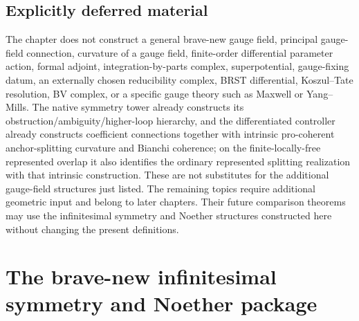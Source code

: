 \subsection{Explicitly deferred material}
\label{subsec:symmetry-noether-explicitly-deferred-material}

The chapter does not construct a general brave-new gauge field, principal gauge-field
connection, curvature of a gauge field, finite-order differential parameter action,
formal adjoint, integration-by-parts complex, superpotential, gauge-fixing datum,
an externally chosen reducibility complex, BRST differential, Koszul--Tate
resolution, BV complex, or a specific gauge theory such as Maxwell or Yang--Mills.
The native symmetry tower already constructs its obstruction/ambiguity/higher-loop
hierarchy, and the differentiated controller already constructs coefficient
connections together with intrinsic pro-coherent anchor-splitting curvature and
Bianchi coherence; on the finite-locally-free represented overlap it also identifies
the ordinary represented splitting realization with that intrinsic construction.
These are not substitutes for the additional gauge-field structures just listed.  The
remaining topics require additional geometric input and belong to later chapters.
Their future comparison theorems may use the infinitesimal symmetry and Noether
structures constructed here without changing the present definitions.
\section{The brave-new infinitesimal symmetry and Noether package}
\label{sec:symmetry-noether-the-brave-new-infinitesimal-symmetry-and-noether-package}

